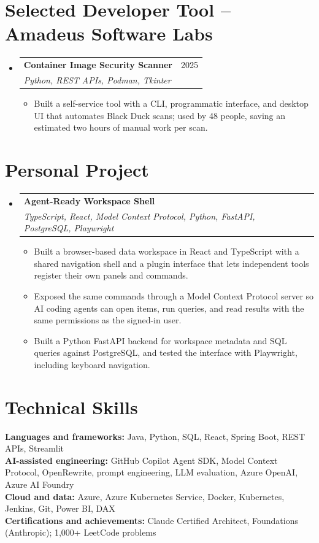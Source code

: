 \documentclass[a4paper,11pt]{article}
\makeatletter
\newcommand{\entry}[4]{\item\begin{tabularx}{\textwidth}{@{}Xr@{}}\textbf{#1}& #2\\\textit{\small #3}&\textit{\small #4}\end{tabularx}\vspace{-5pt}}
\newcommand{\bulletpoint}[1]{\item\small{#1}}
\makeatother
\begin{document}
\section{Selected Developer Tool -- Amadeus Software Labs}
\begin{itemize}[leftmargin=0in,label={}]
  \entry{Container Image Security Scanner}{2025}{Python, REST APIs, Podman, Tkinter}{}
  \begin{itemize}
    \bulletpoint{Built a self-service tool with a CLI, programmatic interface, and desktop UI that automates Black Duck scans; used by 48 people, saving an estimated two hours of manual work per scan.}
  \end{itemize}
\end{itemize}

\section{Personal Project}
\begin{itemize}[leftmargin=0in,label={}]
  \entry{Agent-Ready Workspace Shell}{}{TypeScript, React, Model Context Protocol, Python, FastAPI, PostgreSQL, Playwright}{}
  \begin{itemize}
    \bulletpoint{Built a browser-based data workspace in React and TypeScript with a shared navigation shell and a plugin interface that lets independent tools register their own panels and commands.}
    \bulletpoint{Exposed the same commands through a Model Context Protocol server so AI coding agents can open items, run queries, and read results with the same permissions as the signed-in user.}
    \bulletpoint{Built a Python FastAPI backend for workspace metadata and SQL queries against PostgreSQL, and tested the interface with Playwright, including keyboard navigation.}
  \end{itemize}
\end{itemize}

\section{Technical Skills}
\small\textbf{Languages and frameworks:} Java, Python, SQL, React, Spring Boot, REST APIs, Streamlit \\
\textbf{AI-assisted engineering:} GitHub Copilot Agent SDK, Model Context Protocol, OpenRewrite, prompt engineering, LLM evaluation, Azure OpenAI, Azure AI Foundry \\
\textbf{Cloud and data:} Azure, Azure Kubernetes Service, Docker, Kubernetes, Jenkins, Git, Power BI, DAX \\
\textbf{Certif{}ications and achievements:} Claude \mbox{Certif{}ied} Architect, Foundations (Anthropic); 1,000+ LeetCode problems
\end{document}
